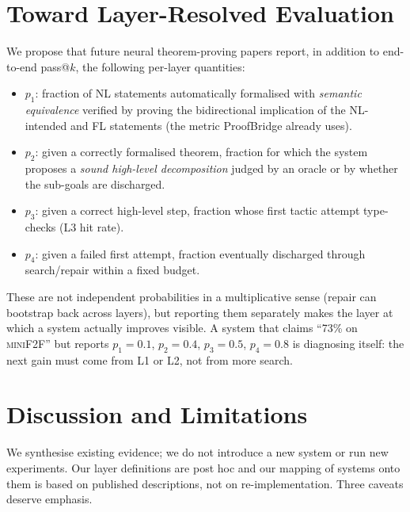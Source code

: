 \documentclass[11pt,letterpaper]{article}
\begin{document}
\section{Toward Layer-Resolved Evaluation}
\label{sec:protocol}

We propose that future neural theorem-proving papers report, in
addition to end-to-end pass@$k$, the following per-layer quantities:

\begin{itemize}[leftmargin=*]
  \item $p_1$: fraction of NL statements automatically formalised
        with \emph{semantic equivalence} verified by proving the
        bidirectional implication of the NL-intended and FL statements
        (the metric ProofBridge already uses).
  \item $p_2$: given a correctly formalised theorem, fraction for
        which the system proposes a \emph{sound high-level decomposition}
        judged by an oracle or by whether the sub-goals are discharged.
  \item $p_3$: given a correct high-level step, fraction whose first
        tactic attempt type-checks (L3 hit rate).
  \item $p_4$: given a failed first attempt, fraction eventually
        discharged through search/repair within a fixed budget.
\end{itemize}

These are not independent probabilities in a multiplicative sense
(repair can bootstrap back across layers), but reporting them separately
makes the layer at which a system actually improves visible. A system
that claims ``73\% on \textsc{miniF2F}'' but reports $p_1=0.1$,
$p_2=0.4$, $p_3=0.5$, $p_4=0.8$ is diagnosing itself: the next gain
must come from L1 or L2, not from more search.

\section{Discussion and Limitations}
\label{sec:disc}

We synthesise existing evidence; we do not introduce a new system or
run new experiments. Our layer definitions are post hoc and our
mapping of systems onto them is based on published descriptions, not
on re-implementation. Three caveats deserve emphasis.
\end{document}

